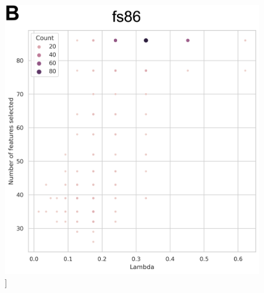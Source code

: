 \documentclass[phd,tocprelim]{cornell}
\renewcommand{\caption}[1]{\singlespacing\hangcaption{#1}\normalspacing}
\begin{document}
\begin{figure}[h!]
		\ContinuedFloat
		\captionsetup{labelformat=adja-page}
    \centering
    \includegraphics[width=1\textwidth]{chapter3/SupplementaryFig9a.png}
    \caption[]{}
\end{figure}
\null
\vfill
\clearpage
\null
\vfill
\end{document}

